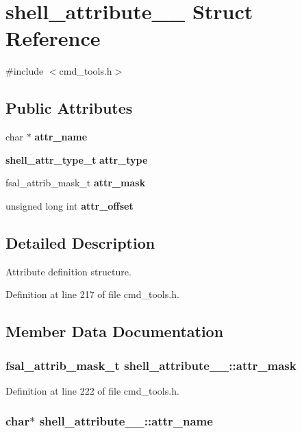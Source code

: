 \section{shell\_\-attribute\_\-\_\- Struct Reference}
\label{structshell__attribute____}


{\ttfamily \#include $<$cmd\_\-tools.h$>$}\subsection*{Public Attributes}
\begin{DoxyCompactItemize}
\item 
char $\ast$ {\bf attr\_\-name}
\item 
{\bf shell\_\-attr\_\-type\_\-t} {\bf attr\_\-type}
\item 
fsal\_\-attrib\_\-mask\_\-t {\bf attr\_\-mask}
\item 
unsigned long int {\bf attr\_\-offset}
\end{DoxyCompactItemize}


\subsection{Detailed Description}
Attribute definition structure. 

Definition at line 217 of file cmd\_\-tools.h.

\subsection{Member Data Documentation}
\subsubsection[{attr\_\-mask}]{\setlength{\rightskip}{0pt plus 5cm}fsal\_\-attrib\_\-mask\_\-t {\bf shell\_\-attribute\_\-\_\-::attr\_\-mask}}\label{structshell__attribute_____a975e907b2930a059e71faa41725aa853}


Definition at line 222 of file cmd\_\-tools.h.
\subsubsection[{attr\_\-name}]{\setlength{\rightskip}{0pt plus 5cm}char$\ast$ {\bf shell\_\-attribute\_\-\_\-::attr\_\-name}}\label{structshell__attribute_____a20b64795e8300f56437578bd7fd99be9}


